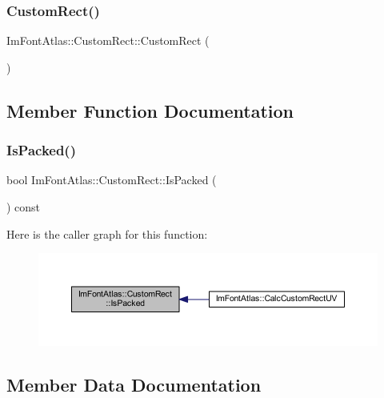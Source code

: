 \subsubsection{\texorpdfstring{Custom\+Rect()}{CustomRect()}}
{\footnotesize\ttfamily Im\+Font\+Atlas\+::\+Custom\+Rect\+::\+Custom\+Rect (\begin{DoxyParamCaption}{ }\end{DoxyParamCaption})\hspace{0.3cm}{\ttfamily [inline]}}



\subsection{Member Function Documentation}
\mbox{\label{struct_im_font_atlas_1_1_custom_rect_ac15602342c8eabbddf559bc84a3e6700}} 
\subsubsection{\texorpdfstring{Is\+Packed()}{IsPacked()}}
{\footnotesize\ttfamily bool Im\+Font\+Atlas\+::\+Custom\+Rect\+::\+Is\+Packed (\begin{DoxyParamCaption}{ }\end{DoxyParamCaption}) const\hspace{0.3cm}{\ttfamily [inline]}}

Here is the caller graph for this function\+:
\nopagebreak
\begin{figure}[H]
\begin{center}
\leavevmode
\includegraphics[width=350pt]{struct_im_font_atlas_1_1_custom_rect_ac15602342c8eabbddf559bc84a3e6700_icgraph}
\end{center}
\end{figure}


\subsection{Member Data Documentation}
\mbox{\label{struct_im_font_atlas_1_1_custom_rect_aeffa65b37c8d9241e3720472a019aad2}} 
